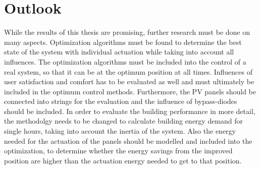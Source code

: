 \chapter{Outlook}
\label{ch:outlook}

While the results of this thesis are promising, further research must be done on many aspects. Optimization algorithms must be found to determine the best state of the system with individual actuation while taking into account all influences. The optimization algorithms must be included into the control of a real system, so that it can be at the optimum position at all times. Influences of user satisfaction and comfort has to be evaluated as well and must ultimately be included in the optimum control methods. Furthermore, the PV panels should be connected into strings for the evaluation and the influence of bypass-diodes should be included. In order to evaluate the building performance in more detail, the methodolgy needs to be changed to calculate building energy demand for single hours, taking into account the inertia of the system. Also the energy needed for the actuation of the panels should be modelled and included into the optimization, to determine whether the energy savings from the improved position are higher than the actuation energy needed to get to that position. 